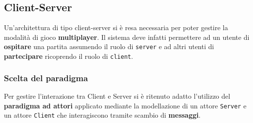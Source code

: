 \subsection{Client-Server} 
Un'architettura di tipo client-server si è resa necessaria per poter gestire la modalità di gioco \textbf{multiplayer}. Il sistema deve infatti permettere ad un utente di \textbf{ospitare} una partita assumendo il ruolo di \texttt{server} e ad altri utenti di \textbf{partecipare} ricoprendo il ruolo di \texttt{client}. 

\subsubsection{Scelta del paradigma}
Per gestire l'interazione tra Client e Server si è ritenuto adatto l'utilizzo del \textbf{paradigma ad attori} applicato mediante la modellazione di un attore \texttt{Server} e un attore \texttt{Client} che interagiscono tramite scambio di \textbf{messaggi}. 

